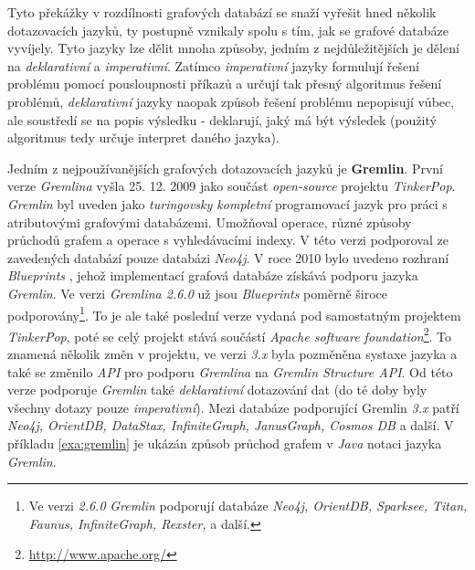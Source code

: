 Tyto překážky v rozdílnosti grafových databází se snaží vyřešit hned několik dotazovacích jazyků, ty postupně vznikaly spolu s tím, jak se grafové databáze vyvíjely. Tyto jazyky lze dělit mnoha způsoby, jedním z nejdůležitějších je dělení na \textit{deklarativní} a \textit{imperativní}. Zatímco \textit{imperativní} jazyky formulují řešení problému pomocí pousloupnosti příkazů a určují tak přesný algoritmus řešení problémů, \textit{deklarativní} jazyky naopak způsob řešení problému nepopisují vůbec, ale soustředí se na popis výsledku - deklarují, jaký má být výsledek (použitý algoritmus tedy určuje interpret daného jazyka).\cite{Chao16}

Jedním z nejpoužívanějších grafových dotazovacích jazyků je \textbf{Gremlin}. První verze \textit{Gremlina} vyšla 25. 12. 2009 \cite{Gremlin09} jako součást \textit{open-source} projektu \textit{TinkerPop}. \textit{Gremlin} byl uveden jako \textit{turingovsky kompletní} programovací jazyk pro práci s atributovými grafovými databázemi. Umožňoval \textit{} operace, různé způsoby průchodů grafem a operace s vyhledávacími indexy. V této verzi podporoval ze zavedených databází pouze databázi \textit{Neo4j}. 
V roce 2010 bylo uvedeno rozhraní \textit{Blueprints} \cite{Blueprints10}, jehož implementací grafová databáze získává podporu jazyka \textit{Gremlin}. 
Ve verzi \textit{Gremlina 2.6.0} \cite{Gremlin14} už jsou \textit{Blueprints} poměrně široce podporovány\footnote{Ve verzi \textit{2.6.0} \textit{Gremlin} podporují databáze \textit{Neo4j, OrientDB, Sparksee, Titan, Faunus, InfiniteGraph, Rexster,} a další.}. To je ale také poslední verze vydaná pod samostatným projektem \textit{TinkerPop}, poté se celý projekt stává součástí \textit{Apache software foundation}\footnote{\url{http://www.apache.org/}}. To znamená několik změn v projektu, ve verzi \textit{3.x} \cite{Gremlin17} byla pozměněna systaxe jazyka a také se změnilo \textit{API} pro podporu \textit{Gremlina} na \textit{Gremlin Structure API}. Od této verze podporuje \textit{Gremlin} také \textit{deklarativní} dotazování dat (do té doby byly všechny dotazy pouze \textit{imperativní}).  Mezi databáze podporující Gremlin \textit{3.x} patří \textit{Neo4j, OrientDB, DataStax, InfiniteGraph, JanusGraph, Cosmos DB} a další. V příkladu \ref{exa:gremlin} je ukázán způsob průchod grafem v \textit{Java} notaci jazyka \textit{Gremlin}.



